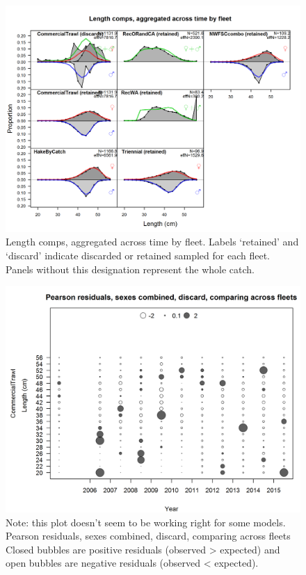 \documentclass[12pt,]{article}
\begin{document}
\begin{figure}[htbp]
\centering
\includegraphics{./r4ss/plots_mod1/comp_lenfit__aggregated_across_time.png}
\caption{Length comps, aggregated across time by fleet. Labels
`retained' and `discard' indicate discarded or retained sampled for each
fleet. Panels without this designation represent the whole catch.
\label{fig:mod1_30_comp_lenfit__aggregated_across_time}}
\end{figure}

\begin{figure}[htbp]
\centering
\includegraphics{./r4ss/plots_mod1/comp_lenfit_sex1mkt1_multi-fleet_comparison.png}
\caption{Note: this plot doesn't seem to be working right for some
models. Pearson residuals, sexes combined, discard, comparing across
fleets\\
Closed bubbles are positive residuals (observed \textgreater{} expected)
and open bubbles are negative residuals (observed \textless{} expected).
\label{fig:mod1_31_comp_lenfit_sex1mkt1_multi-fleet_comparison}}
\end{figure}
\end{document}

